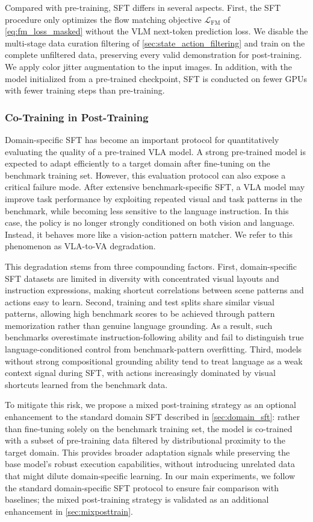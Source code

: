 Compared with pre-training, SFT differs in several aspects.
First, the SFT procedure only optimizes the flow matching objective $\mathcal{L}_{\mathrm{FM}}$ of \cref{eq:fm_loss_masked} without the VLM next-token prediction loss.
We disable the multi-stage data curation filtering of \cref{sec:state_action_filtering} and train on the complete unfiltered data, preserving every valid demonstration for post-training.
We apply color jitter augmentation to the input images.
In addition, with the model initialized from a pre-trained checkpoint, SFT is conducted on fewer GPUs with fewer training steps than pre-training. 

\subsubsection{Co-Training in Post-Training}
Domain-specific SFT has become an important protocol for quantitatively evaluating the quality of a pre-trained VLA model. 
A strong pre-trained model is expected to adapt efficiently to a target domain after fine-tuning on the benchmark training set. However, this evaluation protocol can also expose a critical failure mode. After extensive benchmark-specific SFT, a VLA model may improve task performance by exploiting repeated visual and task patterns in the benchmark, while becoming less sensitive to the language instruction. In this case, the policy is no longer strongly conditioned on both vision and language. Instead, it behaves more like a vision-action pattern matcher. We refer to this phenomenon as VLA-to-VA degradation.

This degradation stems from three compounding factors. First, domain-specific SFT datasets are limited in diversity with concentrated visual layouts and instruction expressions, making shortcut correlations between scene patterns and actions easy to learn. Second, training and test splits share similar visual patterns, allowing high benchmark scores to be achieved through pattern memorization rather than genuine language grounding. As a result, such benchmarks overestimate instruction-following ability and fail to distinguish true language-conditioned control from benchmark-pattern overfitting. Third, models without strong compositional grounding ability tend to treat language as a weak context signal during SFT, with actions increasingly dominated by visual shortcuts learned from the benchmark data.

To mitigate this risk, we propose a mixed post-training strategy as an optional enhancement to the standard domain SFT described in \cref{sec:domain_sft}: rather than fine-tuning solely on the benchmark training set, the model is co-trained with a subset of pre-training data filtered by distributional proximity to the target domain. 
This provides broader adaptation signals while preserving the base model's robust execution capabilities, without introducing unrelated data that might dilute domain-specific learning. 
In our main experiments, we follow the standard domain-specific SFT protocol to ensure fair comparison with baselines; the mixed post-training strategy is validated as an additional enhancement in \cref{sec:mixposttrain}.

